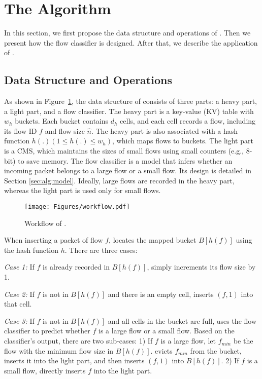 \section{The \alg{} Algorithm}


In this section, we first propose the data structure and operations of \alg{}. Then we present how the flow classifier is designed. After that, we describe the application of \alg{}.


\subsection{Data Structure and Operations}


%
As shown in Figure~\ref{fig:workflow}, the data structure of \alg{} consists of three parts: a heavy part, a light part, and a flow classifier.
%
The heavy part is a key-value (KV) table with \(w_h\) buckets. Each bucket contains \(d_h\) cells, and each cell records a flow, including its flow ID \(f\) and flow size \(\hat{n}\). The heavy part is also associated with a hash function \(h(.) (1 \leqslant h(.) \leqslant w_h)\), which maps flows to buckets.
%
The light part is a CMS, which maintains the sizes of small flows using small counters (e.g., 8-bit) to save memory.
%
The flow classifier is a model that infers whether an incoming packet belongs to a large flow or a small flow. Its design is detailed in Section \ref{sec:alg:model}. Ideally, large flows are recorded in the heavy part, whereas the light part is used only for small flows.


\begin{figure}[!ht]
    \centering  
    \texttt{[image: Figures/workflow.pdf]}
    \caption{Workflow of \alg{}.}
    \label{fig:workflow}
\end{figure}


%
When inserting a packet of flow \(f\), \alg{} locates the mapped bucket \(B[h(f)]\) using the hash function \(h\). There are three cases:


\textit{Case 1:} If \(f\) is already recorded in \(B[h(f)]\), \alg{} simply increments its flow size by 1.


\textit{Case 2:} If \(f\) is not in \(B[h(f)]\) and there is an empty cell, \alg{} inserts \((f, 1)\) into that cell.


\textit{Case 3:} If \(f\) is not in \(B[h(f)]\) and all cells in the bucket are full, \alg{} uses the flow classifier to predict whether \(f\) is a large flow or a small flow. Based on the classifier’s output, there are two sub-cases:
%
1) If \(f\) is a large flow, let \(f_{min}\) be the flow with the minimum flow size in \(B[h(f)]\). \alg{} evicts \(f_{min}\) from the bucket, inserts it into the light part, and then inserts \((f, 1)\) into \(B[h(f)]\).
%
2) If \(f\) is a small flow, \alg{} directly inserts \(f\) into the light part.


